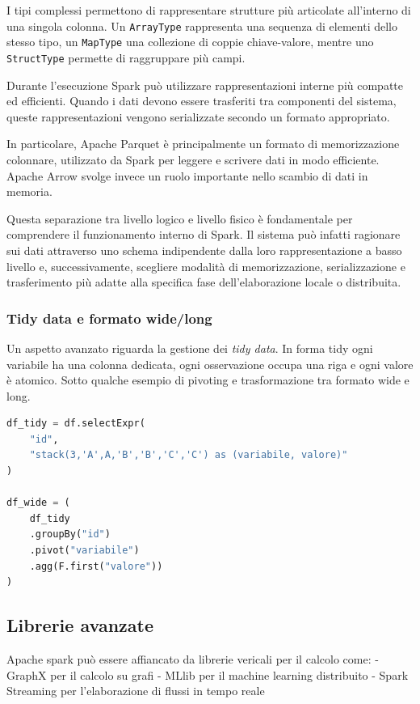 \documentclass{article}
\begin{document}
I tipi complessi permettono di rappresentare %
strutture più articolate all'interno di una singola %
colonna. Un \texttt{ArrayType} rappresenta una sequenza %
di elementi dello stesso tipo, un \texttt{MapType} una %
collezione di coppie chiave-valore, mentre uno \texttt{StructType} %
permette di raggruppare più campi.

Durante l'esecuzione %
Spark può utilizzare rappresentazioni interne più compatte %
ed efficienti. Quando i dati devono essere trasferiti tra %
componenti del sistema, queste rappresentazioni %
vengono serializzate secondo un formato appropriato.

In particolare, Apache Parquet \cite{Apache-Parquet} è principalmente un formato %
di memorizzazione colonnare, utilizzato da Spark per leggere %
e scrivere dati in modo efficiente. Apache Arrow \cite{Apache-Arrow}  svolge invece %
un ruolo importante nello scambio di dati in memoria. %

Questa separazione tra livello logico e livello fisico è fondamentale %
per comprendere il funzionamento interno di Spark. Il sistema può infatti %
ragionare sui dati attraverso uno schema indipendente dalla loro %
rappresentazione a basso livello e, successivamente, scegliere modalità %
di memorizzazione, serializzazione e trasferimento più adatte alla specifica %
fase dell'elaborazione locale o distribuita.



\subsubsection{Tidy data e formato wide/long}
Un aspetto avanzato riguarda la gestione dei \emph{tidy data}. %
In forma tidy ogni variabile ha una colonna dedicata, ogni %
osservazione occupa una riga e ogni valore è atomico. %
Sotto qualche esempio di pivoting e trasformazione tra formato wide e long.

\begin{lstlisting}[language=Python]
df_tidy = df.selectExpr(
    "id",
    "stack(3,'A',A,'B','B','C','C') as (variabile, valore)"
)

df_wide = (
    df_tidy
    .groupBy("id")
    .pivot("variabile")
    .agg(F.first("valore"))
)
\end{lstlisting}


\subsection{Librerie avanzate}
Apache spark può essere affiancato da librerie vericali per il calcolo come: 
- GraphX per il calcolo su grafi \cite{GraphX}
- MLlib per il machine learning distribuito \cite{MLlib}
- Spark Streaming per l'elaborazione di flussi in tempo reale \cite{Spark-Structured-Streaming}
\end{document}
